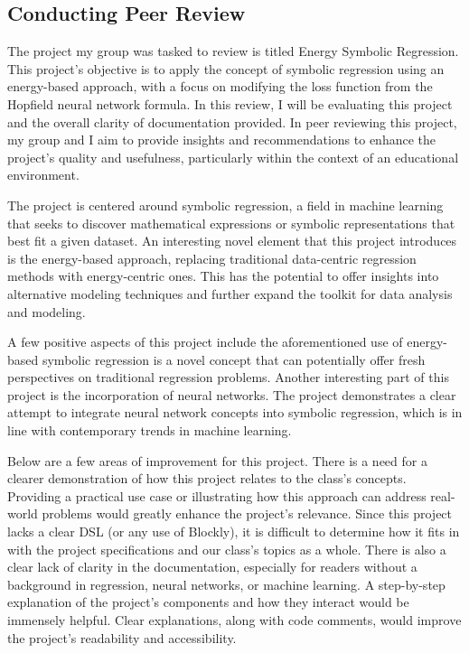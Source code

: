 \documentclass{article}
\theoremstyle{theorem}
\theoremstyle{definition}
\theoremstyle{remark}
\begin{document}
\subsection{Conducting Peer Review}

The project my group was tasked to review is titled Energy Symbolic Regression. This project's objective is to apply the concept of symbolic regression using an energy-based approach, with a focus on modifying the loss function from the Hopfield neural network formula. In this review, I will be evaluating this project and the overall clarity of documentation provided. In peer reviewing this project, my group and I aim to provide insights and recommendations to enhance the project's quality and usefulness, particularly within the context of an educational environment. 

The project is centered around symbolic regression, a field in machine learning that seeks to discover mathematical expressions or symbolic representations that best fit a given dataset. An interesting novel element that this project introduces is the energy-based approach, replacing traditional data-centric regression methods with energy-centric ones. This has the potential to offer insights into alternative modeling techniques and further expand the toolkit for data analysis and modeling.

A few positive aspects of this project include the aforementioned use of energy-based symbolic regression is a novel concept that can potentially offer fresh perspectives on traditional regression problems. Another interesting part of this project is the incorporation of neural networks. The project demonstrates a clear attempt to integrate neural network concepts into symbolic regression, which is in line with contemporary trends in machine learning.

Below are a few areas of improvement for this project. There is a need for a clearer demonstration of how this project relates to the class's concepts. Providing a practical use case or illustrating how this approach can address real-world problems would greatly enhance the project's relevance. Since this project lacks a clear DSL (or any use of Blockly), it is difficult to determine how it fits in with the project specifications and our class's topics as a whole. There is also a clear lack of clarity in the documentation, especially for readers without a background in regression, neural networks, or machine learning. A step-by-step explanation of the project's components and how they interact would be immensely helpful. Clear explanations, along with code comments, would improve the project's readability and accessibility.
\end{document}
